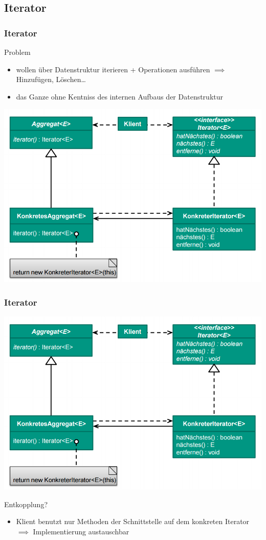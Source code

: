 \documentclass[18pt]{beamer}
\begin{document}
	\subsection{Iterator}
	\begin{frame}
		\frametitle{Iterator}
		\begin{block}{Problem}
			\begin{itemize}
				\item wollen über Datenstruktur iterieren + Operationen ausführen \linebreak $\implies$ Hinzufügen, Löschen\dots \pause
				\item das Ganze ohne Kentniss des internen Aufbaus der Datenstruktur 
			\end{itemize}
		\end{block}
		\pause
		\centering
		\includegraphics[scale=0.35]{./pics/tut3/iter.png}
	\end{frame}

	\begin{frame}
		\frametitle{Iterator}
		\centering
		\includegraphics[scale=0.35]{./pics/tut3/iter.png}
		\begin{block}{Entkopplung?}
			\begin{itemize}
				\pause 
				\item Klient benutzt nur Methoden der Schnittstelle auf dem konkreten Iterator \linebreak $\implies$ Implementierung austauschbar
			\end{itemize}
		\end{block}
	\end{frame}
\end{document}
